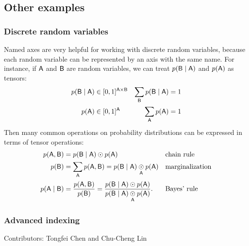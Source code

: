 \documentclass{article}
\begin{document}
\subsection{Other examples}

\subsubsection{Discrete random variables}

Named axes are very helpful for working with discrete random variables, because each random variable can be represented by an axis with the same name. For instance, if $\name{A}$ and $\name{B}$ are random variables, we can treat $p(\name{B} \mid \name{A})$ and $p(\name{A})$ as tensors:
\begin{align*}
p(\name{B} \mid \name{A}) &\in [0, 1]^{\name{A} \times \name{B}} & \nsum{\name{B}} p(\name{B} \mid \name{A}) &= 1 \\
p(\name{A}) &\in [0, 1]^{\name{A}} & \nsum{\name{A}} p(\name{A}) &= 1
\end{align*}
Then many common operations on probability distributions can be expressed in terms of tensor operations:
\begin{align*}
p(\name{A}, \name{B}) &= p(\name{B} \mid \name{A}) \odot p(\name{A}) && \text{chain rule}\\
p(\name{B}) &= \nsum{\name{A}} p(\name{A}, \name{B}) = p(\name{B} \mid \name{A}) \ndot{\name{A}} p(\name{A}) && \text{marginalization} \\
p(\name{A} \mid \name{B}) &= \frac{p(\name{A}, \name{B})}{p(\name{B})} = \frac{p(\name{B} \mid \name{A}) \odot p(\name{A})}{p(\name{B} \mid \name{A}) \ndot{\name{A}} p(\name{A})}. && \text{Bayes' rule}
\end{align*}

\subsubsection{Advanced indexing}

Contributors: Tongfei Chen and Chu-Cheng Lin
\end{document}
